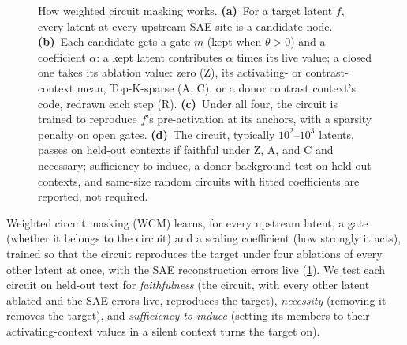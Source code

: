 \documentclass[10pt]{article}
\begin{document}
\begin{figure}[t]
\centering
\resizebox{\linewidth}{!}{}
\caption{How weighted circuit masking works.
\textbf{(a)}~For a target latent $f$, every latent at every upstream SAE site is a candidate node.
\textbf{(b)}~Each candidate gets a gate $m$ (kept when $\theta > 0$) and a coefficient $\alpha$: a kept latent contributes $\alpha$ times its live value; a closed one takes its ablation value: zero (Z), its activating- or contrast-context mean, Top-K-sparse (A, C), or a donor contrast context's code, redrawn each step (R).
\textbf{(c)}~Under all four, the circuit is trained to reproduce $f$'s pre-activation at its anchors, with a sparsity penalty on open gates.
\textbf{(d)}~The circuit, typically $10^{2}$--$10^{3}$ latents, passes on held-out contexts if faithful under Z, A, and C and necessary; sufficiency to induce, a donor-background test on held-out contexts, and same-size random circuits with fitted coefficients are reported, not required.}
\label{fig:overview}
\end{figure}

Weighted circuit masking (WCM) learns, for every upstream latent, a gate (whether it belongs to the circuit) and a scaling coefficient (how strongly it acts), trained so that the circuit reproduces the target under four ablations of every other latent at once, with the SAE reconstruction errors live (\cref{fig:overview}).
We test each circuit on held-out text for \emph{faithfulness} (the circuit, with every other latent ablated and the SAE errors live, reproduces the target), \emph{necessity} (removing it removes the target), and \emph{sufficiency to induce} (setting its members to their activating-context values in a silent context turns the target on).
\end{document}
